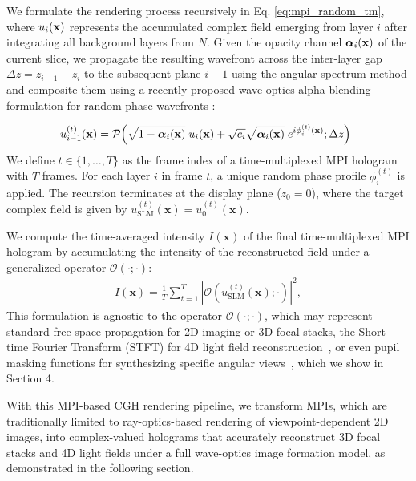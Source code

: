 We formulate the rendering process recursively in Eq. \ref{eq:mpi_random_tm}, where $u_i(\mathbf{x})$ represents the accumulated complex field emerging from layer $i$ after integrating all background layers from $N$. Given the opacity channel $\boldsymbol{\alpha}_i(\mathbf{x})$ of the current slice, we propagate the resulting wavefront across the inter-layer gap $\Delta z = z_{i - 1} - z_{i}$ to the subsequent plane $i-1$ using the angular spectrum method \cite{goodman2005introduction} and composite them using a recently proposed wave optics alpha blending formulation for random-phase wavefronts \cite{chao2025rpws}:

\begin{align}
    \hspace*{-0.5em}
    u_{i - 1}^{(t)} (\mathbf{x}) = \mathcal{P} \Big( \sqrt{1 - \boldsymbol{\alpha}_i(\mathbf{x})} \; u_i(\mathbf{x}) +  \sqrt{c_i} \sqrt{\boldsymbol{\alpha}_i(\mathbf{x})} \; e^{i \phi_i^{(t)}(\mathbf{x})} ; \Delta z\Big)
    \label{eq:mpi_random_tm}
\end{align}
We define $t \in \{1, \dots, T\}$ as the frame index of a time-multiplexed MPI hologram with $T$ frames. For each layer $i$ in frame $t$, a unique random phase profile $\phi_i^{(t)}$ is applied. The recursion terminates at the display plane ($z_0=0$), where the target complex field is given by $u_\text{SLM}^{(t)}(\mathbf{x}) = u_0^{(t)}(\mathbf{x})$.

We compute the time-averaged intensity $I(\mathbf{x})$ of the final time-multiplexed MPI hologram by accumulating the intensity of the reconstructed field under a generalized operator $\mathcal{O}(\cdot; \cdot)$:
\begin{align}
    I(\mathbf{x})  = \frac{1}{T} \sum_{t=1}^{T} \left| \mathcal{O} \left( u_\text{SLM}^{(t)}(\mathbf{x}); \cdot \right) \right|^2 ,
    \label{eq:tm}
\end{align}
This formulation is agnostic to the operator $\mathcal{O}(\cdot; \cdot)$, which may represent standard free-space propagation for 2D imaging or 3D focal stacks, the Short-time Fourier Transform (STFT) for 4D light field reconstruction~\cite{choi2022time}, or even pupil masking functions for synthesizing specific angular views~\cite{schiffers2023stochastic, shi2024ergonomic}, which we show in Section 4.

With this MPI-based CGH rendering pipeline, we transform MPIs, which are traditionally limited to ray-optics-based rendering of viewpoint-dependent 2D images, into complex-valued holograms that accurately reconstruct 3D focal stacks and 4D light fields under a full wave-optics image formation model, as demonstrated in the following section. 

\label{subsec:mpi_cgh}
